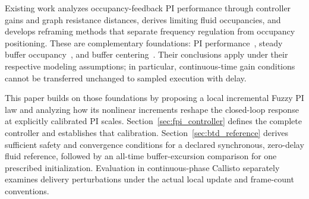Existing work analyzes occupancy-feedback PI performance through controller gains and graph resistance distances, derives limiting fluid occupancies, and develops reframing methods that separate frequency regulation from occupancy positioning. These are complementary foundations: PI performance~\cite{lall2022resistance}, steady buffer occupancy~\cite{lall2024bufferOccupancy}, and buffer centering~\cite{lall2023bufferCentering}. Their conclusions apply under their respective modeling assumptions; in particular, continuous-time gain conditions cannot be transferred unchanged to sampled execution with delay.

This paper builds on those foundations by proposing a local incremental Fuzzy PI law and analyzing how its nonlinear increments reshape the closed-loop response at explicitly calibrated PI scales. Section~\ref{sec:fpi_controller} defines the complete controller and establishes that calibration. Section~\ref{sec:btd_reference} derives sufficient safety and convergence conditions for a declared synchronous, zero-delay fluid reference, followed by an all-time buffer-excursion comparison for one prescribed initialization. Evaluation in continuous-phase Callisto separately examines delivery perturbations under the actual local update and frame-count conventions.
